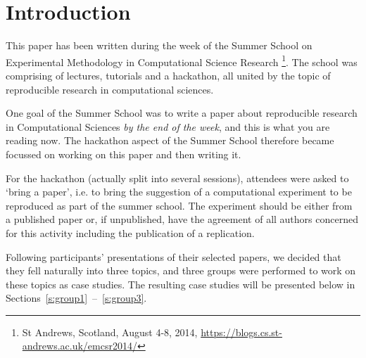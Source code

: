 \section{Introduction}
\label{s:intro}

This paper has been written during the week of the Summer School
on Experimental Methodology in Computational Science Research
\footnote{St Andrews, Scotland, August 4-8, 2014,
\url{https://blogs.cs.st-andrews.ac.uk/emcsr2014/}}. The 
school was comprising of lectures, tutorials and a hackathon,
all united by the topic of reproducible research in computational
sciences. 

One goal of the Summer School was to write a paper about reproducible research in
Computational Sciences \emph{by the end of the week}, and this is what you are reading now.
The hackathon aspect of the Summer School therefore became focussed on working on this paper
and then writing it. 

For the hackathon (actually split into several sessions), attendees 
were asked to `bring a paper', i.e. to bring the suggestion of a 
computational experiment to be reproduced as part of the summer school. 
The experiment should be either from a published paper or, if unpublished, 
have the agreement of all authors concerned for this activity including 
the publication of a replication.  

Following participants' presentations of their 
selected papers, we decided that they fell naturally into three topics, 
and three groups were performed to work on these topics as case studies.
The resulting case studies will be presented below
in Sections~\ref{s:group1}~--~\ref{s:group3}.



